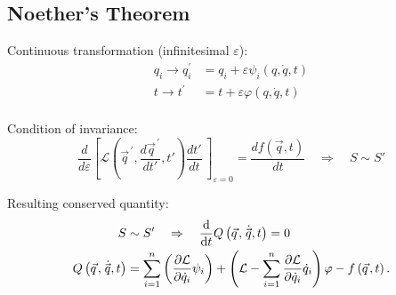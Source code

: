 	\subsection{Noether's Theorem}
		\noindent
		Continuous transformation (infinitesimal $\varepsilon$):
		\begin{equation}
			\begin{aligned}
				q_i \rightarrow q_{i}^{\prime} &= q_i+\varepsilon\psi_i\left(q,\dot{q},t\right) \\
				t\rightarrow t^{\prime}\, &= t+\varepsilon\varphi\left(q,\dot{q},t\right) \\
			\end{aligned}
		\end{equation}

		\noindent
		Condition of invariance:
		\begin{equation}
			\frac{d}{d\varepsilon}\left[\mathcal{L}\left( {\vec{q}}^{\,\prime},\frac{d {\vec{q}}^{\,\prime}}{dt'},t'\right) \frac{dt'}{dt}\,\right]_{\varepsilon=0}=\frac{df(\vec{q}, t)}{dt} \quad \Rightarrow \quad S \sim S'
		\end{equation}

		\noindent
		Resulting conserved quantity:
		\begin{equation}
			\begin{aligned}
				S &\sim S' \quad \Rightarrow \quad
				\dv{t} Q\left(\vec{q},\dot{\vec{q}},t\right) = 0 \\
				Q\left(\vec{q},\dot{\vec{q}},t\right) &= \sum_{i=1}^{n}\left(\frac{\partial\mathcal{L}}{\partial{\dot{q}}_i}\psi_i\right)+\left(\mathcal{L}-\sum_{i=1}^{n}{\frac{\partial\mathcal{L}}{\partial{\dot{q}}_i}{\dot{q}}_i}\right)\varphi - f\left(\vec{q},t\right).
			\end{aligned}
		\end{equation}